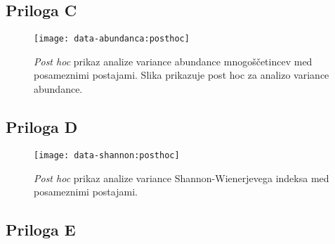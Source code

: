 \renewcommand{\figurename}{Priloga}

\newpage
\subsection*{Priloga C}

\setcounter{figure}{3}

\begin{figure}[h]
 \texttt{[image: data-abundanca:posthoc]}
\caption[Post hoc prikaz analize variance za abundanco]{\emph{Post hoc} prikaz analize variance abundance mnogoščetincev med posameznimi postajami. Slika prikazuje post hoc za analizo variance abundance.}
\label{abundanca:posthoc}
\end{figure}

\newpage
\subsection*{Priloga D}

\begin{figure}[h]
 \texttt{[image: data-shannon:posthoc]}
\caption[Post hoc prikaz analize variance Shannon-Wienerjevega indeksa]{\emph{Post hoc} prikaz analize variance Shannon-Wienerjevega indeksa med posameznimi postajami.}
\label{shannon:posthoc}
\end{figure}

\newpage
\renewcommand{\tablename}{Priloga}
\setcounter{table}{4}

\subsection*{Priloga E}


